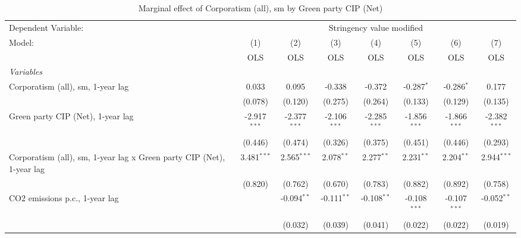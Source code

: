 
\begin{table}[htbp]
   \caption{Marginal effect of Corporatism (all), sm by Green party CIP (Net)}
   \centering
   \begin{tabular}{lccccccc}
      \toprule
      Dependent Variable: & \multicolumn{7}{c}{Stringency value modified}\\
      Model:                                                                & (1)            & (2)            & (3)            & (4)            & (5)            & (6)            & (7)\\  
                                                                            &  OLS           & OLS            & OLS            & OLS            & OLS            & OLS            & OLS\\  
      \midrule
      \emph{Variables}\\
      Corporatism (all), sm, 1-year lag                                     & 0.033          & 0.095          & -0.338         & -0.372         & -0.287$^{*}$   & -0.286$^{*}$   & 0.177\\   
                                                                            & (0.078)        & (0.120)        & (0.275)        & (0.264)        & (0.133)        & (0.129)        & (0.135)\\   
      Green party CIP (Net), 1-year lag                                     & -2.917$^{***}$ & -2.377$^{***}$ & -2.106$^{***}$ & -2.285$^{***}$ & -1.856$^{***}$ & -1.866$^{***}$ & -2.382$^{***}$\\   
                                                                            & (0.446)        & (0.474)        & (0.326)        & (0.375)        & (0.451)        & (0.446)        & (0.293)\\   
      Corporatism (all), sm, 1-year lag x Green party CIP (Net), 1-year lag & 3.481$^{***}$  & 2.565$^{***}$  & 2.078$^{**}$   & 2.277$^{**}$   & 2.231$^{**}$   & 2.204$^{**}$   & 2.944$^{***}$\\   
                                                                            & (0.820)        & (0.762)        & (0.670)        & (0.783)        & (0.882)        & (0.892)        & (0.758)\\   
      CO2 emissions p.c., 1-year lag                                        &                & -0.094$^{**}$  & -0.111$^{**}$  & -0.108$^{**}$  & -0.108$^{***}$ & -0.107$^{***}$ & -0.052$^{**}$\\   
                                                                            &                & (0.032)        & (0.039)        & (0.041)        & (0.022)        & (0.022)        & (0.019)\\   

\end{tabular}
\end{table}
